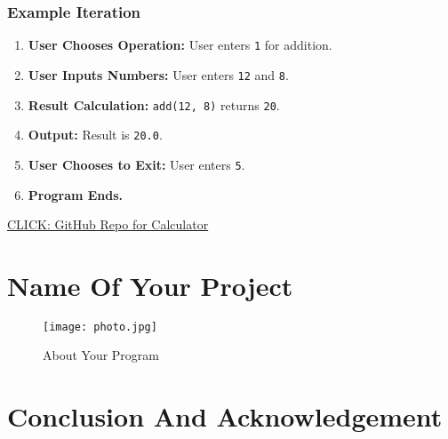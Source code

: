 \documentclass{article}
\begin{document}
\subsubsection*{Example Iteration}

\begin{enumerate}
    \item \textbf{User Chooses Operation:} User enters \texttt{1} for addition.
    \item \textbf{User Inputs Numbers:} User enters \texttt{12} and \texttt{8}.
    \item \textbf{Result Calculation:} \texttt{add(12, 8)} returns \texttt{20}.
    \item \textbf{Output:} Result is \texttt{20.0}.
    \item \textbf{User Chooses to Exit:} User enters \texttt{5}.
    \item \textbf{Program Ends.}
\end{enumerate}

\href{https://github.com/jitsharma2003/create-calculator.c}{CLICK: GitHub Repo for Calculator}


\newpage

\newpage
\section*{Name Of Your Project}
\begin{figure}[h!]
    \centering
\texttt{[image: photo.jpg]}
    \caption{About Your Program}
    \label{fig:image1}
\end{figure}

\newpage

\section*{Conclusion And Acknowledgement}
\end{document}
